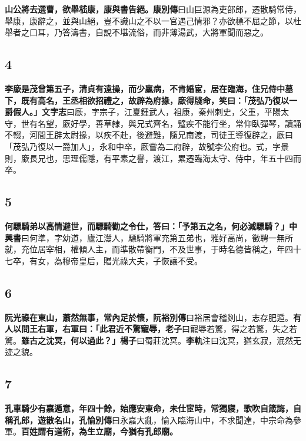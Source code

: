 \textbf{山公將去選曹，欲舉嵇康，康與書告絕。}{\footnotesize \textbf{康別傳}曰山巨源為吏部郎，遷散騎常侍，舉康，康辭之，並與山絕，豈不識山之不以一官遇己情邪？亦欲標不屈之節，以杜舉者之口耳，乃答濤書，自說不堪流俗，而非薄湯武，大將軍聞而惡之。}

\subsection*{4}

\textbf{李廞是茂曾第五子，清貞有遠操，而少羸病，不肯婚宦，居在臨海，住兄侍中墓下，既有高名，王丞相欲招禮之，故辟為府掾，廞得牋命，笑曰：「茂弘乃復以一爵假人。」}{\footnotesize \textbf{文字志}曰廞，字宗子，江夏鍾武人，祖康，秦州刺史，父重，平陽太守，世有名望，廞好學，善草隸，與兄式齊名，躄疾不能行坐，常仰臥彈琴，讀誦不輟，河間王辟太尉掾，以疾不赴，後避難，隨兄南渡，司徒王導復辟之，廞曰「茂弘乃復以一爵加人」，永和中卒，廞嘗為二府辟，故號李公府也。式，字景則，廞長兄也，思理儒隱，有平素之譽，渡江，累遷臨海太守、侍中，年五十四而卒。}

\subsection*{5}

\textbf{何驃騎弟以高情避世，而驃騎勸之令仕，答曰：「予第五之名，何必減驃騎？」}{\footnotesize \textbf{中興書}曰何準，字幼道，廬江灊人，驃騎將軍充第五弟也，雅好高尚，徵聘一無所就，充位居宰相，權傾人主，而準散帶衡門，不及世事，于時名德皆稱之，年四十七卒，有女，為穆帝皇后，贈光祿大夫，子恢讓不受。}

\subsection*{6}

\textbf{阮光祿在東山，蕭然無事，常內足於懷，}{\footnotesize \textbf{阮裕別傳}曰裕居會稽剡山，志存肥遁。}\textbf{有人以問王右軍，右軍曰：「此君近不驚寵辱，}{\footnotesize \textbf{老子}曰寵辱若驚，得之若驚，失之若驚。}\textbf{雖古之沈冥，何以過此？」}{\footnotesize \textbf{楊子}曰蜀莊沈冥。\textbf{李軌}注曰沈冥，猶玄寂，泯然无迹之貌。}

\subsection*{7}

\textbf{孔車騎少有嘉遁意，年四十餘，始應安東命，未仕宦時，常獨寢，歌吹自箴誨，自稱孔郎，遊散名山，}{\footnotesize \textbf{孔愉別傳}曰永嘉大亂，愉入臨海山中，不求聞達，中宗命為參軍。}\textbf{百姓謂有道術，為生立廟，今猶有孔郎廟。}

